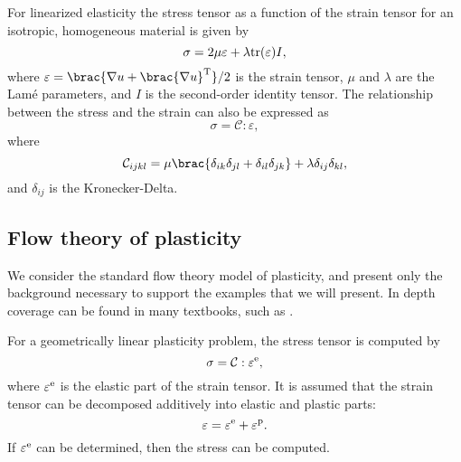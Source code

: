 For linearized elasticity the stress tensor as a function of the strain
tensor for an isotropic, homogeneous material is given by
%
\begin{equation}
  \sigma = 2\mu \varepsilon + \lambda {\rm tr}(\varepsilon) I,
\label{eq:oelgaard-1:elas_stress_def}
\end{equation}
%
where $\varepsilon = \brac{\nabla u + \brac{\nabla u}^{\rm T}}/2$
is the strain tensor, $\mu$ and $\lambda$ are the Lam\'{e} parameters,
and $I$ is the second-order identity tensor.  The relationship between
the stress and the strain can also be expressed as
%
\begin{equation}
  \sigma = \mathcal{C} : \varepsilon,
\end{equation}
where
\begin{equation}
  \mathcal{C}_{ijkl} = \mu\brac{\delta_{ik}\delta_{jl} + \delta_{il}\delta_{jk}} +
  \lambda\delta_{ij}\delta_{kl},
\label{eq:oelgaard-1:elas_constitutive_tensor}
\end{equation}
and $\delta_{ij}$ is the Kronecker-Delta.

\subsection{Flow theory of plasticity}
\label{sec:oelgaard-1:plasticity}

We consider the standard flow theory model of plasticity, and present
only the background necessary to support the examples that we will
present. In depth coverage can be found in many textbooks, such
as \citet{Lubliner2008}.

For a geometrically linear plasticity problem, the stress tensor is
computed by
\begin{equation}
  \sigma = \mathcal{C} : \varepsilon^{\rm e},
\label{eq:oelgaard-1:plas_stress_def}
\end{equation}
%
where $\varepsilon^{\rm e}$ is the elastic part of the strain tensor.
It is assumed that the strain tensor can be decomposed additively
into elastic and plastic parts:
%
\begin{equation}
  \varepsilon = \varepsilon^{\rm e} + \varepsilon^{\rm p}.
\label{eq:oelgaard-1:plas_strain_decomposed}
\end{equation}
%
If $\varepsilon^{\rm e}$ can be determined, then the stress can be
computed.

